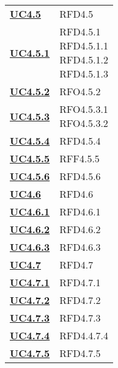 \begin{longtable}[H]{| >{\centering\bfseries}p{8cm} | >{\centering\arraybackslash}p{8cm} |}
    \hyperref[ssub:uc4.5]{UC4.5} & RFD4.5 \\

    \hyperref[par:uc4.5.1]{UC4.5.1}  & \makecell{
        \rule{0pt}{4ex}
        RFD4.5.1 \\
        RFD4.5.1.1 \\
        RFD4.5.1.2 \\
        RFD4.5.1.3
        \rule{0pt}{4ex}
        } \\

    \hyperref[par:uc4.5.2]{UC4.5.2} & RFO4.5.2\\

    \hyperref[par:uc4.5.3]{UC4.5.3} & \makecell{
        \rule{0pt}{4ex}
        RFO4.5.3.1 \\
        RFO4.5.3.2
        \rule{0pt}{4ex}
        } \\

    \hyperref[par:uc4.5.4]{UC4.5.4} & RFD4.5.4 \\

    \hyperref[par:uc4.5.5]{UC4.5.5} & RFF4.5.5 \\

    \hyperref[par:uc4.5.6]{UC4.5.6} & RFD4.5.6 \\

    \hyperref[ssub:uc4.6]{UC4.6} & RFD4.6 \\

    \hyperref[par:uc4.6.1]{UC4.6.1} & RFD4.6.1 \\

    \hyperref[par:uc4.6.2]{UC4.6.2} & RFD4.6.2 \\

    \hyperref[par:uc4.6.3]{UC4.6.3} & RFD4.6.3 \\


    \hyperref[ssub:uc4.7]{UC4.7} & RFD4.7 \\

    \hyperref[par:uc4.7.1]{UC4.7.1} & RFD4.7.1 \\

    \hyperref[par:uc4.7.2]{UC4.7.2} & RFD4.7.2 \\

    \hyperref[par:uc4.7.3]{UC4.7.3} & RFD4.7.3 \\

    \hyperref[par:uc4.7.4]{UC4.7.4} & RFD4.4.7.4 \\

    \hyperref[par:uc4.7.5]{UC4.7.5} & RFD4.7.5 \\


\end{longtable}
